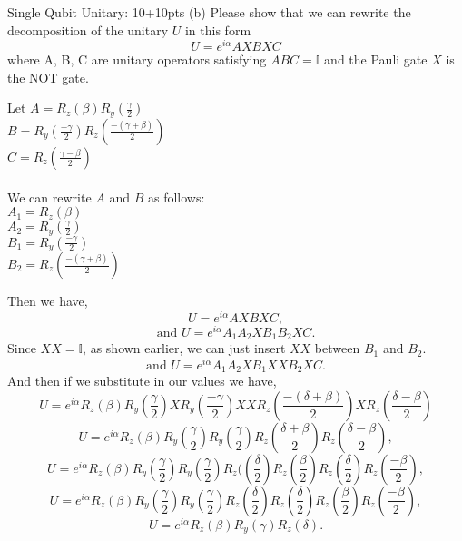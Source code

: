 \documentclass[12pt]{article}
\makeatletter
\newcommand{\<}{\langle}
\renewcommand{\>}{\rangle}
\newenvironment{problem}{\@startsection
       {section}
       {1}
       {-.2em}
       {-3.5ex plus -1ex minus -.2ex}
       {2.3ex plus .2ex}
       {\pagebreak[3]
       \large\bf\noindent{Problem }
       }
       }
       {%
       \begin{center}\large\bf \end{center}}
\makeatother
\begin{document}
\begin{problem}{Single Qubit Unitary: 10+10pts}
(b)   Please show that we can rewrite the decomposition of the unitary $U$ in this form 
\[
	U = e^{i\alpha} AXBXC
\]
where A, B, C are unitary operators satisfying $ABC=\mathbb{I}$ and the Pauli gate $X$ is the NOT gate.\\
\begin{multicols}{2}
Let $A = R_z(\beta)R_y(\frac{\gamma}{2})$\\
\hspace*{1.35cm}$B = R_y(\frac{-\gamma}{2})R_z(\frac{-(\gamma+\beta)}{2})$\\
\hspace*{1.35cm}$C = R_z(\frac{\gamma-\beta}{2})$\\
\columnbreak \\
We can rewrite $A$ and $B$ as follows:\\
$A_1 = R_z(\beta)$\\
$A_2 = R_y(\frac{\gamma}{2})$\\
$B_1 = R_y(\frac{-\gamma}{2})$\\
$B_2 = R_z(\frac{-(\gamma+\beta)}{2})$\\
\end{multicols}
Then we have,
$$U = e^{i\alpha} AXBXC,$$
$$\text{and }U = e^{i\alpha}A_1A_2XB_1B_2XC.$$
Since $XX = \mathbb{I}$, as shown earlier, we can just insert $XX$ between $B_1$ and $B_2$.
$$\text{and }U = e^{i\alpha}A_1A_2XB_1XXB_2XC.$$
And then if we substitute in our values we have,
$$U = e^{i\alpha}R_z \left( \beta \right) R_y\left(\frac{\gamma}{2}\right)XR_y\left(\frac{-\gamma}{2}\right)XXR_z\left(\frac{-(\delta+\beta)}{2}\right)XR_z\left(\frac{\delta-\beta}{2}\right)$$
$$U = e^{i\alpha}R_z \left( \beta \right) R_y\left(\frac{\gamma}{2}\right)R_y\left(\frac{\gamma}{2}\right)R_z\left(\frac{\delta+\beta}{2}\right)R_z\left(\frac{\delta-\beta}{2}\right),$$
$$U = e^{i\alpha}R_z \left( \beta \right) R_y\left(\frac{\gamma}{2}\right)R_y\left(\frac{\gamma}{2}\right)R_z(\left(\frac{\delta}{2}\right)R_z\left(\frac{\beta}{2}\right)R_z \left( \frac{\delta}{2} \right) R_z \left( \frac{-\beta}{2} \right),$$
$$U = e^{i\alpha}R_z \left( \beta \right) R_y \left( \frac{\gamma}{2} \right) R_y \left( \frac{\gamma}{2} \right) R_z \left( \frac{\delta}{2} \right) R_z \left( \frac{\delta}{2} \right) R_z \left( \frac{\beta}{2} \right) R_z \left( \frac{-\beta}{2} \right),$$
$$U = e^{i\alpha}R_z \left( \beta \right) R_y \left( \gamma \right) R_z\left( \delta \right).$$
\end{problem}
\end{document}
